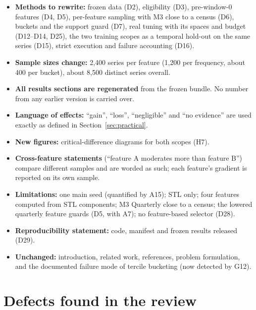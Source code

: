 \documentclass[11pt,a4paper]{article}
\begin{document}
\begin{itemize}
  \item \textbf{Methods to rewrite:} frozen data (D2), eligibility (D3), pre-window-0 features
  (D4, D5), per-feature sampling with M3 close to a census (D6), buckets and the support guard (D7),
  real tuning with its spaces and budget (D12--D14, D25), the two training scopes as a temporal
  hold-out on the same series (D15), strict execution and failure accounting (D16).
  \item \textbf{Sample sizes change:} 2,400 series per feature (1,200 per frequency, about 400 per
  bucket), about 8,500 distinct series overall.
  \item \textbf{All results sections are regenerated} from the frozen bundle. No number from any
  earlier version is carried over.
  \item \textbf{Language of effects:} ``gain'', ``loss'', ``negligible'' and ``no evidence'' are used
  exactly as defined in Section~\ref{sec:practical}.
  \item \textbf{New figures:} critical-difference diagrams for both scopes (H7).
  \item \textbf{Cross-feature statements} (``feature A moderates more than feature B'') compare
  different samples and are worded as such; each feature's gradient is reported on its own sample.
  \item \textbf{Limitations:} one main seed (quantified by A15); STL only; four features computed
  from STL components; M3 Quarterly close to a census; the lowered quarterly feature guards (D5,
  with A7); no feature-based selector (D28).
  \item \textbf{Reproducibility statement:} code, manifest and frozen results released (D29).
  \item \textbf{Unchanged:} introduction, related work, references, problem formulation, and the
  documented failure mode of tercile bucketing (now detected by G12).
\end{itemize}

\appendix

\section{Defects found in the review}\label{app:defects}
\end{document}

